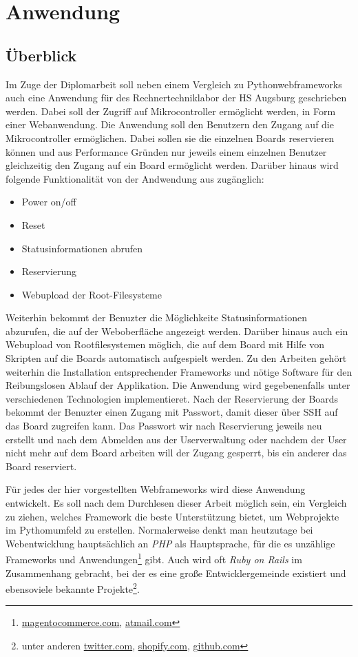 \chapter{Anwendung}
\section{Überblick}
Im Zuge der Diplomarbeit soll neben einem Vergleich zu Pythonwebframeworks auch
eine Anwendung für des Rechnertechniklabor der HS Augsburg geschrieben werden.
Dabei soll der Zugriff auf Mikrocontroller ermöglicht werden, in Form einer
Webanwendung. Die Anwendung soll den Benutzern den Zugang auf die
Mikrocontroller ermöglichen. Dabei sollen sie die einzelnen Boards reservieren
können und aus Performance Gründen nur jeweils einem einzelnen Benutzer
gleichzeitig den Zugang auf ein Board ermöglicht werden. Darüber hinaus wird
folgende Funktionalität von der Andwendung aus zugänglich:

\begin{itemize}
  \item Power on/off
  \item Reset
  \item Statusinformationen abrufen
  \item Reservierung
  \item Webupload der Root-Filesysteme
\end{itemize}

Weiterhin bekommt der Benuzter die Möglichkeite Statusinformationen abzurufen, 
die auf der Weboberfläche angezeigt werden. Darüber hinaus auch ein Webupload
von Rootfilesystemen möglich, die auf dem Board mit Hilfe von Skripten auf die
Boards automatisch aufgespielt werden. Zu den Arbeiten gehört weiterhin die
Installation entsprechender Frameworks und nötige Software für den
Reibungslosen Ablauf der Applikation. Die Anwendung wird gegebenenfalls unter
verschiedenen Technologien implementieret. Nach der Reservierung der Boards
bekommt der Benuzter einen Zugang mit Passwort, damit dieser über SSH auf das
Board zugreifen kann. Das Passwort wir nach Reservierung jeweils neu erstellt
und nach dem Abmelden aus der Userverwaltung oder nachdem der User nicht mehr
auf dem Board arbeiten will der Zugang gesperrt, bis ein anderer das Board
reserviert. 

Für jedes der hier vorgestellten Webframeworks wird diese Anwendung entwickelt.
Es soll nach dem Durchlesen dieser Arbeit möglich sein, ein Vergleich zu ziehen,
welches Framework die beste Unterstützung bietet, um Webprojekte im
Pythomumfeld zu erstellen. Normalerweise denkt man heutzutage bei
Webentwicklung hauptsächlich an \emph{PHP} als Hauptsprache, für die es
unzählige Frameworks und Anwendungen\footnote{\url{magentocommerce.com},
\url{atmail.com}} gibt. Auch wird oft \emph{Ruby on Rails} im Zusammenhang
gebracht, bei der es eine große Entwicklergemeinde existiert und ebensoviele 
bekannte Projekte\footnote{unter anderen \url{twitter.com}, \url{shopify.com}, 
\url{github.com}}.

